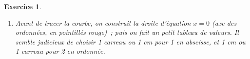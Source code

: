 \documentclass[10pt]{article}
\newtheorem{exo}{Exercice}
\begin{document}
\begin{exo}
\begin{enumerate}
\begin{itemize}
\item[\textbullet] \[
\left.
    \begin{array}{ll}
        \lim\limits_{x\to -\infty}x&=-\infty \\
        \lim\limits_{x\to -\infty}\frac{1}{x}&=0
    \end{array}
\right \}\implies \lim\limits_{x\to -\infty}\left(x+4\times \frac{1}{x}\right)=\text{\og}~-\infty+4\times 0~\text{ \fg}=-\infty.
\] Cette limite ne permet de mettre aucune asymptote en évidence.
\item[\textbullet] \[
\left.
    \begin{array}{ll}
        \lim\limits_{x\to +\infty}x&=+\infty \\
        \lim\limits_{x\to +\infty}\frac{1}{x}&=0
    \end{array}
\right \}\implies \lim\limits_{x\to +\infty}\left(x+4\times \frac{1}{x}\right)=\text{\og}~+\infty+4\times 0~\text{ \fg}=+\infty.
\] Cette limite ne permet de mettre aucune asymptote en évidence.
\item[\textbullet] \[
\left.
    \begin{array}{ll}
        \lim\limits_{x\to 0,~x<0}
x&=0 \\
        \lim\limits_{x\to 0,~x<0}
\frac{1}{x}&=-\infty
    \end{array}
\right \}\implies \lim\limits_{x\to 0,~x<0}
\left(x+4\times \frac{1}{x}\right)=\text{\og}~0+4\times (-\infty)~\text{ \fg}=-\infty.
\] 

On en déduit que la droite d'équation $x=0$ est asymptote (verticale) à $\mathcal{C}.$
\item[\textbullet] \[
\left.
    \begin{array}{ll}
        \lim\limits_{x\to 0,~x>0}
x&=0 \\
        \lim\limits_{x\to 0,~x>0}
\frac{1}{x}&=+\infty
    \end{array}
\right \}\implies \lim\limits_{x\to 0,~x>0}
\left(x+4\times \frac{1}{x}\right)=\text{\og}~0+4\times (+\infty)~\text{ \fg}=+\infty.
\] 

On en déduit (pour la 2 fois) que la droite d'équation $x=0$ est asymptote (verticale) à $\mathcal{C}.$
\end{itemize}
\item Avant de tracer la courbe, on construit la droite d'équation $x=0$ (axe des ordonnées, en pointillés rouge)~; puis on fait un petit tableau de valeurs. Il semble judicieux de choisir 1 carreau ou 1 cm pour 1 en abscisse, et 1 cm ou 1 carreau pour 2 en ordonnée.



\end{enumerate}
\end{exo}
\end{document}
